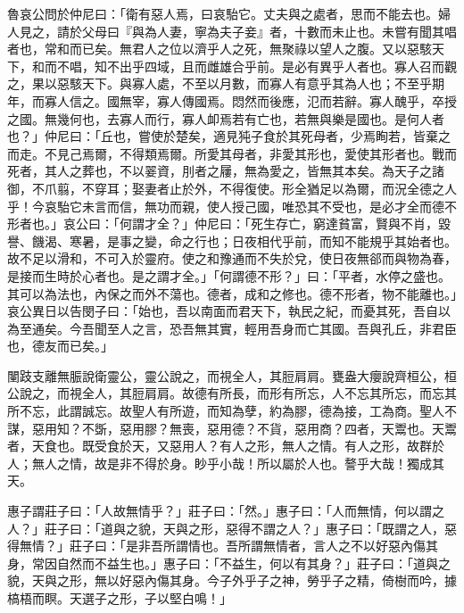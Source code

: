 \begin{pinyinscope}
魯哀公問於仲尼曰：「衛有惡人焉，曰哀駘它。丈夫與之處者，思而不能去也。婦人見之，請於父母曰『與為人妻，寧為夫子妾』者，十數而未止也。未嘗有聞其唱者也，常和而已矣。無君人之位以濟乎人之死，無聚祿以望人之腹。又以惡駭天下，和而不唱，知不出乎四域，且而雌雄合乎前。是必有異乎人者也。寡人召而觀之，果以惡駭天下。與寡人處，不至以月數，而寡人有意乎其為人也；不至乎期年，而寡人信之。國無宰，寡人傳國焉。悶然而後應，氾而若辭。寡人醜乎，卒授之國。無幾何也，去寡人而行，寡人卹焉若有亡也，若無與樂是國也。是何人者也？」仲尼曰：「丘也，嘗使於楚矣，適見㹠子食於其死母者，少焉眴若，皆棄之而走。不見己焉爾，不得類焉爾。所愛其母者，非愛其形也，愛使其形者也。戰而死者，其人之葬也，不以翣資，刖者之屨，無為愛之，皆無其本矣。為天子之諸御，不爪翦，不穿耳；娶妻者止於外，不得復使。形全猶足以為爾，而況全德之人乎！今哀駘它未言而信，無功而親，使人授己國，唯恐其不受也，是必才全而德不形者也。」哀公曰：「何謂才全？」仲尼曰：「死生存亡，窮達貧富，賢與不肖，毀譽、饑渴、寒暑，是事之變，命之行也；日夜相代乎前，而知不能規乎其始者也。故不足以滑和，不可入於靈府。使之和豫通而不失於兌，使日夜無郤而與物為春，是接而生時於心者也。是之謂才全。」「何謂德不形？」曰：「平者，水停之盛也。其可以為法也，內保之而外不蕩也。德者，成和之修也。德不形者，物不能離也。」哀公異日以告閔子曰：「始也，吾以南面而君天下，執民之紀，而憂其死，吾自以為至通矣。今吾聞至人之言，恐吾無其實，輕用吾身而亡其國。吾與孔丘，非君臣也，德友而已矣。」

闉跂支離無脤說衛靈公，靈公說之，而視全人，其脰肩肩。甕盎大癭說齊桓公，桓公說之，而視全人，其脰肩肩。故德有所長，而形有所忘，人不忘其所忘，而忘其所不忘，此謂誠忘。故聖人有所遊，而知為孽，約為膠，德為接，工為商。聖人不謀，惡用知？不斲，惡用膠？無喪，惡用德？不貨，惡用商？四者，天鬻也。天鬻者，天食也。既受食於天，又惡用人？有人之形，無人之情。有人之形，故群於人；無人之情，故是非不得於身。眇乎小哉！所以屬於人也。謷乎大哉！獨成其天。

惠子謂莊子曰：「人故無情乎？」莊子曰：「然。」惠子曰：「人而無情，何以謂之人？」莊子曰：「道與之貌，天與之形，惡得不謂之人？」惠子曰：「既謂之人，惡得無情？」莊子曰：「是非吾所謂情也。吾所謂無情者，言人之不以好惡內傷其身，常因自然而不益生也。」惠子曰：「不益生，何以有其身？」莊子曰：「道與之貌，天與之形，無以好惡內傷其身。今子外乎子之神，勞乎子之精，倚樹而吟，據槁梧而瞑。天選子之形，子以堅白鳴！」


\end{pinyinscope}